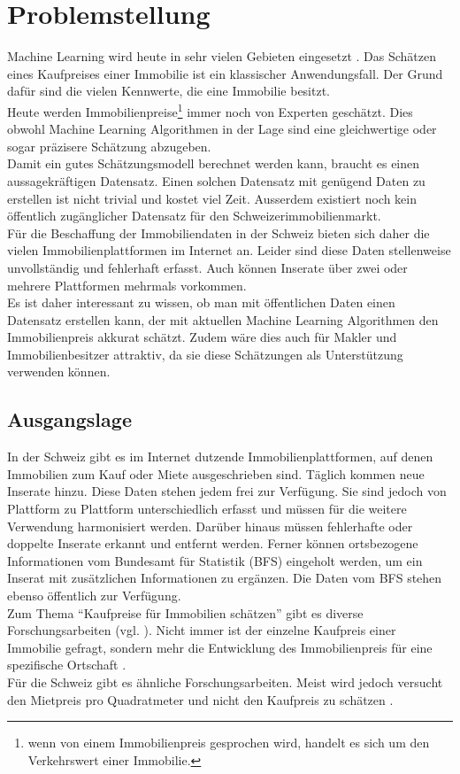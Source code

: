 \section{Problemstellung}
Machine Learning wird heute in sehr vielen Gebieten eingesetzt \cite{forbes}. Das Schätzen eines Kaufpreises einer Immobilie ist ein klassischer Anwendungsfall. Der Grund dafür sind die vielen Kennwerte, die eine Immobilie besitzt.\\
Heute werden Immobilienpreise\footnote{wenn von einem Immobilienpreis gesprochen wird, handelt es sich um den Verkehrswert einer Immobilie.} immer noch von Experten geschätzt. Dies obwohl Machine Learning Algorithmen in der Lage sind eine gleichwertige oder sogar präzisere  Schätzung abzugeben.\\
Damit ein gutes Schätzungsmodell berechnet werden kann, braucht es einen aussagekräftigen Datensatz. Einen solchen Datensatz mit genügend Daten zu erstellen ist nicht trivial und kostet viel Zeit. Ausserdem existiert noch kein öffentlich zugänglicher Datensatz für den Schweizerimmobilienmarkt.\\
Für die Beschaffung der Immobiliendaten in der Schweiz bieten sich daher die vielen Immobilienplattformen im Internet an. Leider sind diese Daten stellenweise unvollständig und fehlerhaft erfasst. Auch können Inserate über zwei oder mehrere Plattformen mehrmals vorkommen.\\
Es ist daher interessant zu wissen, ob man mit öffentlichen Daten einen Datensatz erstellen kann, der mit aktuellen Machine Learning Algorithmen den Immobilienpreis akkurat schätzt. Zudem wäre dies auch für Makler und Immobilienbesitzer attraktiv, da sie diese Schätzungen als Unterstützung verwenden können.
%
%
\subsection{Ausgangslage}
In der Schweiz gibt es im Internet dutzende Immobilienplattformen, auf denen Immobilien zum Kauf oder Miete ausgeschrieben sind. Täglich kommen neue Inserate hinzu. Diese Daten stehen jedem frei zur Verfügung. Sie sind jedoch von Plattform zu Plattform unterschiedlich erfasst und müssen für die weitere Verwendung harmonisiert werden. Darüber hinaus müssen fehlerhafte oder doppelte Inserate erkannt und entfernt werden. Ferner können ortsbezogene Informationen vom Bundesamt für Statistik (BFS) eingeholt werden, um ein Inserat mit zusätzlichen Informationen zu ergänzen. Die Daten vom BFS stehen ebenso öffentlich zur Verfügung.\\[2ex]
%
Zum Thema “Kaufpreise für Immobilien schätzen” gibt es diverse Forschungsarbeiten (vgl. \cite{existing_work_1, existing_work_2, existing_work_4}).
Nicht immer ist der einzelne Kaufpreis einer Immobilie gefragt, sondern mehr die Entwicklung des Immobilienpreis für eine spezifische Ortschaft \cite{existing_work_5}.\\
Für die Schweiz gibt es ähnliche Forschungsarbeiten. Meist wird jedoch versucht den Mietpreis pro Quadratmeter und nicht den Kaufpreis zu schätzen \cite{existing_work_3, existing_work_6}.
%
